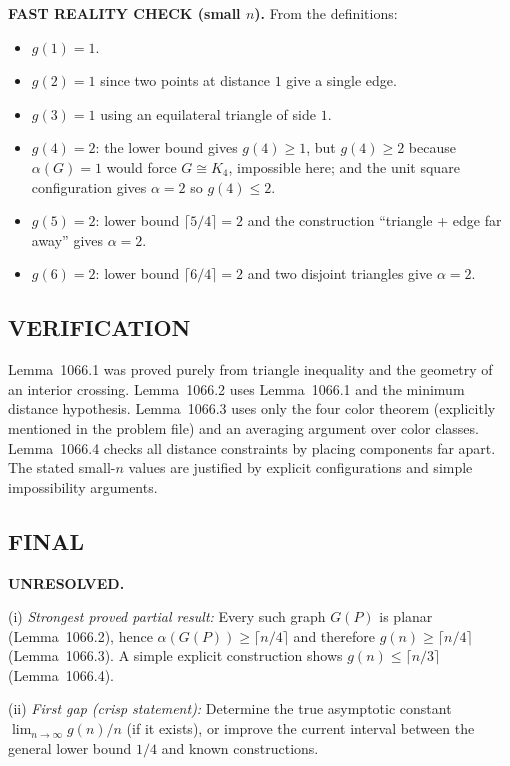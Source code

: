 \textbf{FAST REALITY CHECK (small $n$).}
From the definitions:
\begin{itemize}
\item $g(1)=1$.
\item $g(2)=1$ since two points at distance $1$ give a single edge.
\item $g(3)=1$ using an equilateral triangle of side $1$.
\item $g(4)=2$: the lower bound gives $g(4)\ge 1$, but $g(4)\ge 2$ because $\alpha(G)=1$ would force $G\cong K_4$, impossible here; and the unit square configuration gives $\alpha=2$ so $g(4)\le 2$.
\item $g(5)=2$: lower bound $\lceil 5/4\rceil=2$ and the construction ``triangle + edge far away'' gives $\alpha=2$.
\item $g(6)=2$: lower bound $\lceil 6/4\rceil=2$ and two disjoint triangles give $\alpha=2$.
\end{itemize}

\subsection*{VERIFICATION}
Lemma~1066.1 was proved purely from triangle inequality and the geometry of an interior crossing.
Lemma~1066.2 uses Lemma~1066.1 and the minimum distance hypothesis.
Lemma~1066.3 uses only the four color theorem (explicitly mentioned in the problem file) and an averaging argument over color classes.
Lemma~1066.4 checks all distance constraints by placing components far apart.
The stated small-$n$ values are justified by explicit configurations and simple impossibility arguments.

\subsection*{FINAL}
\textbf{UNRESOLVED.}

(i) \emph{Strongest proved partial result:}
Every such graph $G(P)$ is planar (Lemma~1066.2), hence $\alpha(G(P))\ge \lceil n/4\rceil$ and therefore $g(n)\ge \lceil n/4\rceil$ (Lemma~1066.3).  A simple explicit construction shows $g(n)\le \lceil n/3\rceil$ (Lemma~1066.4).

(ii) \emph{First gap (crisp statement):}
Determine the true asymptotic constant $\lim_{n\to\infty} g(n)/n$ (if it exists), or improve the current interval between the general lower bound $1/4$ and known constructions.

